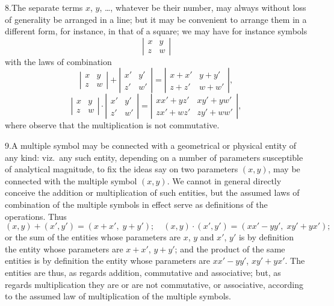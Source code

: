 \documentclass[11pt]{article}
\begin{document}
8.\quad The separate terms $x$, $y$, \ldots, whatever be their number, may always without loss of generality be arranged in a line; but it may be convenient to arrange them in a different form, for instance, in that of a square; we may have for instance symbols
\[
\left|\begin{array}{cc} x & y \\ z & w \end{array}\right|
\]
with the laws of combination
\[
\left|\begin{array}{cc} x & y \\ z & w \end{array}\right| + \left|\begin{array}{cc} x' & y' \\ z' & w' \end{array}\right| = \left|\begin{array}{cc} x + x' & y + y' \\ z + z' & w + w' \end{array}\right|,
\]
\[
\left|\begin{array}{cc} x & y \\ z & w \end{array}\right| \cdot \left|\begin{array}{cc} x' & y' \\ z' & w' \end{array}\right| = \left|\begin{array}{cc} xx' + yz' & xy' + yw' \\ zx' + wz' & zy' + ww' \end{array}\right|,
\]
where observe that the multiplication is not commutative.

9.\quad A multiple symbol may be connected with a geometrical or physical entity of any kind: viz.\ any such entity, depending on a number of parameters susceptible of analytical magnitude, to fix the ideas say on two parameters $(x, y)$, may be connected with the multiple symbol $(x, y)$. We cannot in general directly conceive the addition or multiplication of such entities, but the assumed laws of combination of the multiple symbols in effect serve as definitions of the operations. Thus
\[
(x, y) + (x', y') = (x + x',\; y + y');\quad (x, y)\cdot(x', y') = (xx' - yy',\; xy' + yx');
\]
or the sum of the entities whose parameters are $x$, $y$ and $x'$, $y'$ is by definition the entity whose parameters are $x + x'$, $y + y'$; and the product of the same entities is by definition the entity whose parameters are $xx' - yy'$, $xy' + yx'$. The entities are thus, as regards addition, commutative and associative; but, as regards multiplication they are or are not commutative, or associative, according to the assumed law of multiplication of the multiple symbols.
\end{document}
